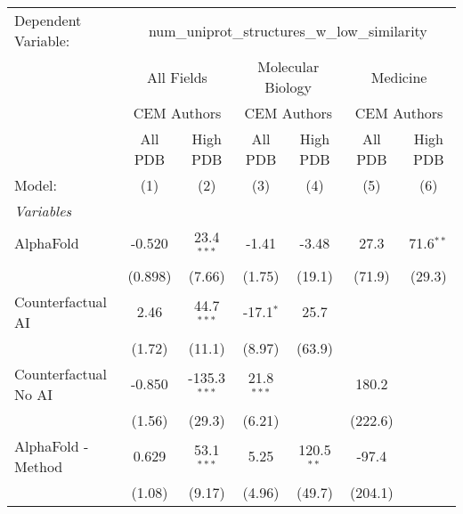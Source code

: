 \begingroup
\centering
\begin{tabular}{lcccccc}
   \tabularnewline \midrule \midrule
   Dependent Variable: & \multicolumn{6}{c}{num\_uniprot\_structures\_w\_low\_similarity}\\
 & \multicolumn{2}{c}{All Fields} & \multicolumn{2}{c}{Molecular Biology} & \multicolumn{2}{c}{Medicine} \\
\cmidrule(lr){2-3} \cmidrule(lr){4-5} \cmidrule(lr){6-7}
 & \multicolumn{2}{c}{CEM Authors} & \multicolumn{2}{c}{CEM Authors} & \multicolumn{2}{c}{CEM Authors} \\
\cmidrule(lr){2-3} \cmidrule(lr){4-5} \cmidrule(lr){6-7}
 & \multicolumn{1}{c}{All PDB} & \multicolumn{1}{c}{High PDB} & \multicolumn{1}{c}{All PDB} & \multicolumn{1}{c}{High PDB} & \multicolumn{1}{c}{All PDB} & \multicolumn{1}{c}{High PDB} \\
\cmidrule(lr){2-2} \cmidrule(lr){3-3} \cmidrule(lr){4-4} \cmidrule(lr){5-5} \cmidrule(lr){6-6} \cmidrule(lr){7-7}
   Model:                                                  & (1)           & (2)            & (3)          & (4)          & (5)     & (6)\\  
   \midrule
   \emph{Variables}\\
   AlphaFold                                               & -0.520        & 23.4$^{***}$   & -1.41        & -3.48        & 27.3    & 71.6$^{**}$\\   
                                                           & (0.898)       & (7.66)         & (1.75)       & (19.1)       & (71.9)  & (29.3)\\   
   Counterfactual AI                                       & 2.46          & 44.7$^{***}$   & -17.1$^{*}$  & 25.7         &         &   \\   
                                                           & (1.72)        & (11.1)         & (8.97)       & (63.9)       &         &   \\   
   Counterfactual No AI                                    & -0.850        & -135.3$^{***}$ & 21.8$^{***}$ &              & 180.2   &   \\   
                                                           & (1.56)        & (29.3)         & (6.21)       &              & (222.6) &   \\   
   AlphaFold - Method                                      & 0.629         & 53.1$^{***}$   & 5.25         & 120.5$^{**}$ & -97.4   &   \\   
                                                           & (1.08)        & (9.17)         & (4.96)       & (49.7)       & (204.1) &   \\   

\end{tabular}

